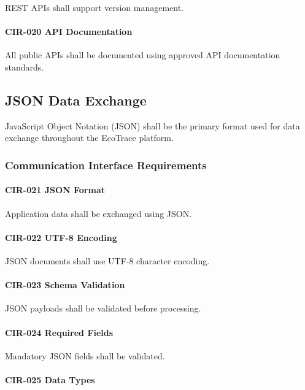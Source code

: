 REST APIs shall support version management.

\paragraph{CIR-020 API Documentation}

All public APIs shall be documented using approved API documentation
standards.


\subsection{JSON Data Exchange}

JavaScript Object Notation (JSON) shall be the primary format used for
data exchange throughout the EcoTrace platform.


\subsubsection*{Communication Interface Requirements}

\paragraph{CIR-021 JSON Format}

Application data shall be exchanged using JSON.

\paragraph{CIR-022 UTF-8 Encoding}

JSON documents shall use UTF-8 character encoding.

\paragraph{CIR-023 Schema Validation}

JSON payloads shall be validated before processing.

\paragraph{CIR-024 Required Fields}

Mandatory JSON fields shall be validated.

\paragraph{CIR-025 Data Types}

